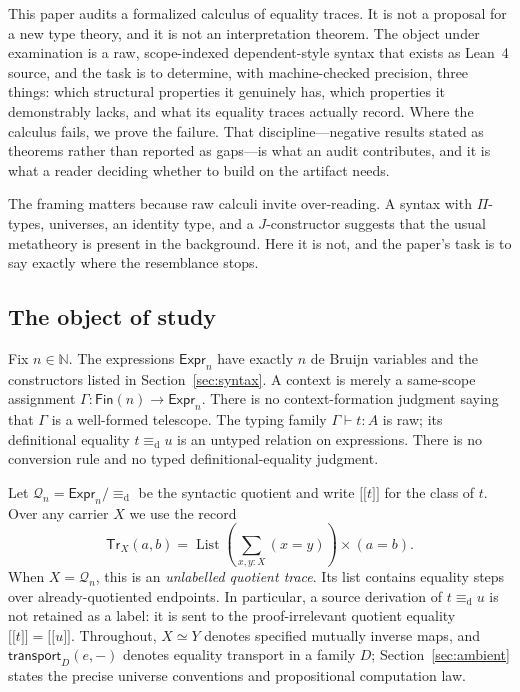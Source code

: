 \documentclass[10pt,reqno]{amsart}
\newcommand{\Fin}{\mathsf{Fin}}
\newcommand{\Expr}{\mathsf{Expr}}
\newcommand{\Tr}{\mathsf{Tr}}
\newcommand{\den}[1]{\mathopen{\lbrack\!\lbrack}#1\mathclose{\rbrack\!\rbrack}}
\newcommand{\defeq}{\mathrel{\equiv_{\mathrm d}}}
\newcommand{\Q}{\mathcal{Q}}
\begin{document}
This paper audits a formalized calculus of equality traces.  It is not a
proposal for a new type theory, and it is not an interpretation theorem.  The
object under examination is a raw, scope-indexed dependent-style syntax that
exists as Lean~4 source, and the task is to determine, with machine-checked
precision, three things: which structural properties it genuinely has, which
properties it demonstrably lacks, and what its equality traces actually record.
Where the calculus fails, we prove the failure.  That discipline---negative
results stated as theorems rather than reported as gaps---is what an audit
contributes, and it is what a reader deciding whether to build on the artifact
needs.

The framing matters because raw calculi invite over-reading.  A syntax with
\(\Pi\)-types, universes, an identity type, and a \(J\)-constructor suggests
that the usual metatheory is present in the background.  Here it is not, and the
paper's task is to say exactly where the resemblance stops.

\subsection*{The object of study}

Fix \(n\in\mathbb N\).  The
expressions \(\Expr_n\) have exactly \(n\) de Bruijn variables and the
constructors listed in Section~\ref{sec:syntax}.  A context is merely a
same-scope assignment
\(\Gamma:\Fin(n)\to\Expr_n\).  There is no context-formation judgment saying
that \(\Gamma\) is a well-formed telescope.  The typing family
\(\Gamma\vdash t:A\) is raw; its definitional equality
\(t\defeq u\) is an untyped relation on expressions.  There is no conversion
rule and no typed definitional-equality judgment.

Let \(\Q_n=\Expr_n/{\defeq}\) be the syntactic quotient and write
\(\den t\) for the class of \(t\).  Over any carrier \(X\) we use the record
\[
 \Tr_X(a,b)
   =\operatorname{List}\!\left(\sum_{x,y:X}(x=y)\right)\times(a=b).
\tag{1.1}\label{eq:intro-trace-record}
\]
When \(X=\Q_n\), this is an \emph{unlabelled quotient trace}.  Its list
contains equality steps over already-quotiented endpoints.  In particular,
a source derivation of \(t\defeq u\) is not retained as a label: it is sent to
the proof-irrelevant quotient equality \(\den t=\den u\).
Throughout, \(X\simeq Y\) denotes specified mutually inverse maps, and
\(\mathsf{transport}_D(e,-)\) denotes equality transport in a family \(D\);
Section~\ref{sec:ambient} states the precise universe conventions and
propositional computation law.
\end{document}
